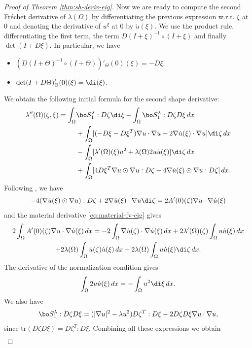\begin{proof}[Proof of Theorem \ref{thm:sh-deriv-eig}]
Now we are ready to compute the second Fréchet derivative of $\lambda(\Omega)$ by differentiating the previous expression w.r.t. $\xi$ at $0$ and denoting the derivative of $u^\xi$ at $0$ by $\dot u(\xi)$. We use the product rule, differentiating the first term, the term $D(I+\xi)^{-1}\circ (I+\xi)$ and finally $\det(I+D\xi)$. In particular, we have
\begin{itemize}
\item $(D(I+\Theta)^{-1}\circ (I+\Theta))'_\Theta(0)(\xi) = - D\xi$.
\item $\det(I+D\Theta)'_\Theta(0)(\xi) = \di(\xi)$.
\end{itemize}

We obtain the following initial formula for the second shape derivative:
\begin{align*}
\lambda''(\Omega)(\zeta,\xi)  = \int_\Omega& \bo S_1^\lambda : D\zeta \di \xi - \int_\Omega \bo S_1^\lambda : D\zeta D\xi \, dx \\
&+ \int_\Omega [(-D\xi -D\xi^T) \nabla u \cdot \nabla u + 2 \nabla \dot u(\xi)\cdot \nabla u] \di \zeta\, dx \\
&-\int_\Omega [\lambda'(\Omega)(\xi) u^2 + \lambda(\Omega) 2 u \dot u(\xi)
]\di \zeta \, dx \\
&+\int_\Omega [4 D\xi^T \nabla u \odot \nabla u:D\zeta -4 \nabla \dot u(\xi) \odot \nabla u:D\zeta ]\, dx.
\end{align*}
Following \cite[p.\,25]{laurain2ndDeriv}, we have
\[
-4(\nabla \dot u(\xi) \odot \nabla u):D\zeta +2\nabla \dot u(\xi)\cdot \nabla u \di \zeta = 2A'(0)(\zeta)\nabla u \cdot \nabla \dot u(\xi)
\]
and the material derivative \eqref{eq:material-fv-eig} gives
\vspace*{-5pt}
\begin{multline*} 2\int_\Omega A'(0)(\zeta) \nabla u \cdot \nabla \dot u(\xi)\, dx = -2\int_\Omega \nabla \dot u(\zeta)\cdot \nabla \dot u(\xi) \, dx+2 \lambda'(\Omega)(\zeta) \int_\Omega u\dot u(\xi)\, dx\\
+2\lambda(\Omega)\int_\Omega \dot u(\zeta)\dot u(\xi)\, dx +2 \lambda(\Omega) \int_\Omega u\dot u(\xi)\di \zeta\, dx.
\end{multline*}
The derivative of the normalization condition gives
\[
\int_\Omega 2u\dot u(\xi) \, dx= - \int_\Omega u^2 \di \xi\, dx.
\]
We also have
\[
\bo S_1^\lambda : D\zeta D \xi = (|\nabla u|^2-\lambda u^2) D\zeta^T : D\xi - 2D\zeta D\xi \nabla u \cdot \nabla u,
\]
since $\text{tr} (D\zeta D\xi) = D\zeta^T: D\xi$.
Combining all these expressions we obtain
\begin{align*}

\end{align*}
\end{proof}
